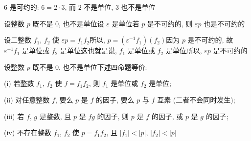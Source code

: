 \begin{example}
    $6$ 是可约的: $6 = 2 \cdot 3$, 而 $2$ 不是单位, $3$ 也不是单位\period
\end{example}

\begin{proposition}
    设整数 $p$ 既不是 $0$, 也不是单位\period 设 $\varepsilon$ 是单位\period 若 $p$ 是不可约的, 则 $\varepsilon p$ 也是不可约的\period
\end{proposition}

\begin{pf}
    设二整数 $f_1$, $f_2$ 使 $\varepsilon p = f_1 f_2$\period 所以, $p = (\varepsilon^{-1} f_1) (f_2)$\period 因为 $p$ 是不可约的, 故 $\varepsilon^{-1} f_1$ 是单位或 $f_2$ 是单位\period 这也就是说, $f_1$ 是单位或 $f_2$ 是单位\period 所以, $\varepsilon p$ 是不可约的\period
\end{pf}

\begin{proposition}
    设整数 $p$ 既不是 $0$, 也不是单位\period 下述四命题等价:

    (i) 若整数 $f_1$, $f_2$ 使 $f = f_1 f_2$, 则 $f_1$ 是单位或 $f_2$ 是单位;

    (ii) 对任意整数 $f$, 要么 $p$ 是 $f$ 的因子, 要么 $p$ 与 $f$ 互素 (二者不会同时发生);

    (iii) 若 $f$, $g$ 是整数, 且 $p$ 是 $fg$ 的因子, 则 $p$ 是 $f$ 的因子, 或 $p$ 是 $g$ 的因子;

    (iv) 不存在整数 $f_1$, $f_2$ 使 $p = f_1 f_2$, 且 $|f_1| < |p|$, $|f_2| < |p|$\period
\end{proposition}

